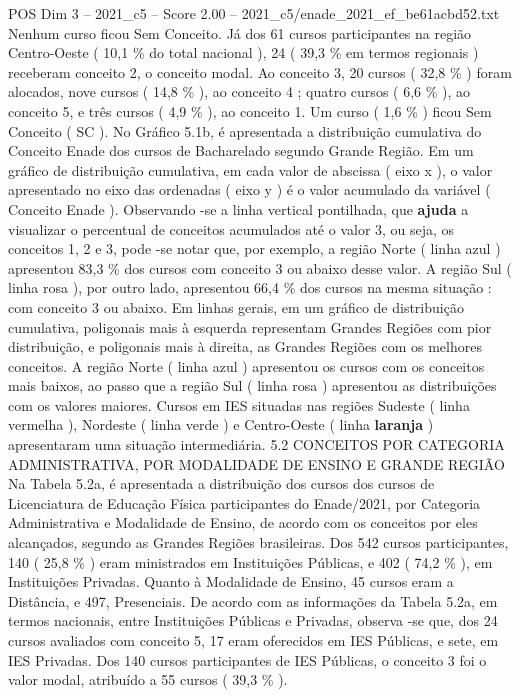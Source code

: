 \begin{textsample}{POS Dim 3 – 2021\_c5 – Score 2.00 – 2021\_c5/enade\_2021\_ef\_be61acbd52.txt}
Nenhum curso ficou Sem Conceito.
Já dos 61 cursos participantes na região Centro-Oeste ( 10,1 \% do total nacional ), 24 ( 39,3 \% em termos regionais ) receberam conceito 2, o conceito modal.
Ao conceito 3, 20 cursos ( 32,8 \% ) foram alocados, nove cursos ( 14,8 \% ), ao conceito 4 ; quatro cursos ( 6,6 \% ), ao conceito 5, e três cursos ( 4,9 \% ), ao conceito 1.
Um curso ( 1,6 \% ) ficou Sem Conceito ( SC ).
No Gráfico 5.1b, é apresentada a distribuição cumulativa do Conceito Enade dos cursos de Bacharelado segundo Grande Região.
Em um gráfico de distribuição cumulativa, em cada valor de abscissa ( eixo x ), o valor apresentado no eixo das ordenadas ( eixo y ) é o valor acumulado da variável ( Conceito Enade ).
Observando -se a linha vertical pontilhada, que \textbf{ajuda} a visualizar o percentual de conceitos acumulados até o valor 3, ou seja, os conceitos 1, 2 e 3, pode -se notar que, por exemplo, a região Norte ( linha azul ) apresentou 83,3 \% dos cursos com conceito 3 ou abaixo desse valor.
A região Sul ( linha rosa ), por outro lado, apresentou 66,4 \% dos cursos na mesma situação : com conceito 3 ou abaixo.
Em linhas gerais, em um gráfico de distribuição cumulativa, poligonais mais à esquerda representam Grandes Regiões com pior distribuição, e poligonais mais à direita, as Grandes Regiões com os melhores conceitos.
A região Norte ( linha azul ) apresentou os cursos com os conceitos mais baixos, ao passo que a região Sul ( linha rosa ) apresentou as distribuições com os valores maiores.
Cursos em IES situadas nas regiões Sudeste ( linha vermelha ), Nordeste ( linha verde ) e Centro-Oeste ( linha \textbf{laranja} ) apresentaram uma situação intermediária. 5.2 CONCEITOS POR CATEGORIA ADMINISTRATIVA, POR MODALIDADE DE ENSINO E GRANDE REGIÃO Na Tabela 5.2a, é apresentada a distribuição dos cursos dos cursos de Licenciatura de Educação Física participantes do Enade/2021, por Categoria Administrativa e Modalidade de Ensino, de acordo com os conceitos por eles alcançados, segundo as Grandes Regiões brasileiras.
Dos 542 cursos participantes, 140 ( 25,8 \% ) eram ministrados em Instituições Públicas, e 402 ( 74,2 \% ), em Instituições Privadas.
Quanto à Modalidade de Ensino, 45 cursos eram a Distância, e 497, Presenciais.
De acordo com as informações da Tabela 5.2a, em termos nacionais, entre Instituições Públicas e Privadas, observa -se que, dos 24 cursos avaliados com conceito 5, 17 eram oferecidos em IES Públicas, e sete, em IES Privadas.
Dos 140 cursos participantes de IES Públicas, o conceito 3 foi o valor modal, atribuído a 55 cursos ( 39,3 \% ).

\end{textsample}

